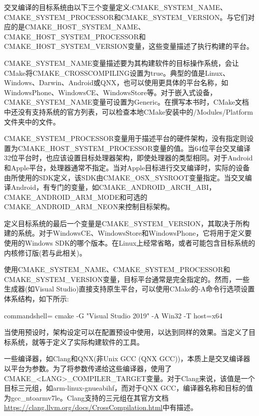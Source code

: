 
交叉编译的目标系统由以下三个变量定义:CMAKE\_SYSTEM\_NAME、CMAKE\_SYSTEM\_PROCESSOR和CMAKE\_SYSTEM\_VERSION。与它们对应的是CMAKE\_HOST\_SYSTEM\_NAME、CMAKE\_HOST\_SYSTEM\_PROCESSOR和CMAKE\_HOST\_SYSTEM\_VERSION变量，这些变量描述了执行构建的平台。

CMAKE\_SYSTEM\_NAME变量描述要为其构建软件的目标操作系统，会让CMake将CMAKE\_CROSSCOMPILING设置为true。典型的值是Linux、Windows、Darwin、Android或QNX，也可以使用更具体的平台名称，如WindowsPhone、WindowsCE、WindowsStore等。对于嵌入式设备，CMAKE\_SYSTEM\_NAME变量可设置为Generic。在撰写本书时，CMake文档中还没有支持系统的官方列表，可以检查本地CMake安装中的/Modules/Platform文件夹中的文件。

CMAKE\_SYSTEM\_PROCESSOR变量用于描述平台的硬件架构，没有指定则设置为CMAKE\_HOST\_SYSTEM\_PROCESSOR变量的值。当64位平台交叉编译32位平台时，也应该设置目标处理器架构，即使处理器的类型相同。对于Android和Apple平台，处理器通常不指定。当对Apple目标进行交叉编译时，实际的设备由所使用的SDK定义，该SDK由CMAKE\_OSX\_SYSROOT变量指定。当交叉编译Android，有专门的变量，如CMAKE\_ANDROID\_ARCH\_ABI，CMAKE\_ANDROID\_ARM\_MODE和可选的CMAKE\_ANDROID\_ARM\_NEON来控制目标架构。

定义目标系统的最后一个变量是CMAKE\_SYSTEM\_VERSION，其取决于所构建的系统。对于WindowsCE、WindowsStore和WindowsPhone，它将用于定义要使用的Windows SDK的哪个版本。在Linux上经常省略，或者可能包含目标系统的内核修订版(若与此相关)。

使用CMAKE\_SYSTEM\_NAME、CMAKE\_SYSTEM\_PROCESSOR和CMAKE\_SYSTEM\_VERSION变量，目标平台通常是完全指定的。然而，一些生成器(如Visual Studio)直接支持原生平台，可以使用CMake的-A命令行选项设置体系结构，如下所示:

\begin{tcblisting}{commandshell={}}
cmake -G "Visual Studio 2019" -A Win32 -T host=x64
\end{tcblisting}

当使用预设时，架构设定可以在配置预设中使用，以达到同样的效果。当定义了目标系统，就等于定义了实际构建软件的工具。

一些编译器，如Clang和QNX(非Unix GCC (QNX GCC))，本质上是交叉编译器以平台为参数。为了将参数传递给这些编译器，使用了CMAKE\_<LANG>\_COMPILER\_TARGET变量。对于Clang来说，该值是一个目标三元组，如arm-linux-gnueabihf，而对于QNX GCC，编译器名称和目标的值为gcc\_ntoarmv7le。Clang支持的三元组在其官方文档\url{https://clang.llvm.org/docs/CrossCompilation.html}中有描述。

